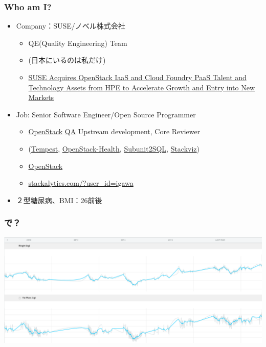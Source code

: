 \documentclass[aspectratio=169,11pt,hyperref={colorlinks=true}]{beamer}
\begin{document}
\begin{frame}
  \frametitle{Who am I?}
  \begin{itemize}
    \item Company：SUSE/ノベル株式会社
      \begin{itemize}
        \item QE(Quality Engineering) Team
        \item[] (日本にいるのは私だけ)
        \item \href{https://www.suse.com/newsroom/post/2016/suse-acquires-openstack-iaas-and-cloud-foundry-paas-talent-and-technology-assets-from-hpe-to-accelerate-growth-and-entry-into-new-markets/}{SUSE Acquires OpenStack IaaS and Cloud Foundry PaaS Talent and Technology Assets from HPE to Accelerate Growth and Entry into New Markets}
      \end{itemize}
    \item Job: Senior Software Engineer/Open Source Programmer
      \begin{itemize}
        \item \href{https://www.openstack.org/}{OpenStack}
         \href{https://wiki.openstack.org/wiki/QA}{QA} Upstream development, Core Reviewer
        \item[] (\href{https://docs.openstack.org/developer/tempest/}{Tempest},
         \href{http://status.openstack.org/openstack-health/}{OpenStack-Health},
         \href{https://docs.openstack.org/developer/subunit2sql/}{Subunit2SQL},
         \href{https://docs.openstack.org/developer/stackviz/}{Stackviz})
        \item \href{https://www.openstack.org/}{OpenStack}
        \item \href{http://stackalytics.com/?user_id=igawa&release=all&metric=all}{stackalytics.com/?user\_id=igawa}
      \end{itemize}
    \item ２型糖尿病、BMI：26前後
  \end{itemize}
\end{frame}

\begin{frame}
  \frametitle{で？}
  \begin{center}
    \includegraphics[width=1.0\textwidth]{my_weight.png}
  \end{center}
\end{frame}
\end{document}
